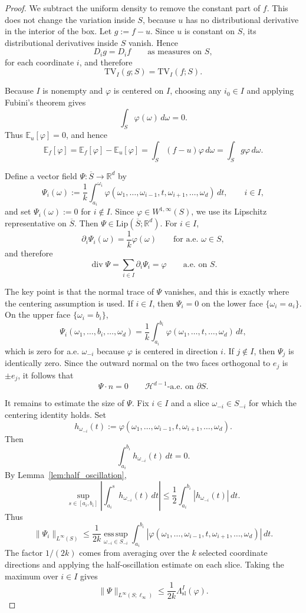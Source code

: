 \documentclass[10pt,a4paper]{amsart}
\newcommand{\TV}{\mathrm{TV}}
\begin{document}
\begin{proof}
We subtract the uniform density to remove the constant part of $f$. This does
not change the variation inside $S$, because $u$ has no distributional
derivative in the interior of the box. Let $g:=f-u$. Since $u$ is constant on
$S$, its distributional derivatives inside $S$ vanish. Hence
$$
D_i g=D_i f
\qquad\text{as measures on }S,
$$
for each coordinate $i$, and therefore
$$
\TV_I(g;S)=\TV_I(f;S).
$$

Because $I$ is nonempty and $\varphi$ is centered on $I$, choosing any
$i_0\in I$ and applying Fubini's theorem gives
$$
\int_S\varphi(\omega)\,d\omega=0.
$$
Thus $\mathbb E_u[\varphi]=0$, and hence
$$
\mathbb E_f[\varphi]
=
\mathbb E_f[\varphi]-\mathbb E_u[\varphi]
=
\int_S (f-u)\varphi\,d\omega
=
\int_S g\varphi\,d\omega.
$$

Define a vector field $\Psi:\overline S\to\mathbb R^d$ by
$$
\Psi_i(\omega)
:=
\frac1k
\int_{a_i}^{\omega_i}
\varphi(\omega_1,\ldots,\omega_{i-1},t,\omega_{i+1},\ldots,\omega_d)\,dt,
\qquad i\in I,
$$
and set $\Psi_i(\omega):=0$ for $i\notin I$. Since
$\varphi\in W^{1,\infty}(S)$, we use its Lipschitz representative on
$\overline S$. Then $\Psi\in\mathrm{Lip}(\overline S;\mathbb R^d)$. For
$i\in I$,
$$
\partial_i\Psi_i(\omega)=\frac1k\varphi(\omega)
\qquad\text{for a.e. }\omega\in S,
$$
and therefore
$$
\operatorname{div}\Psi
=
\sum_{i\in I}\partial_i\Psi_i
=
\varphi
\qquad\text{a.e. on }S.
$$

The key point is that the normal trace of $\Psi$ vanishes, and this is
exactly where the centering assumption is used. If $i\in I$, then $\Psi_i=0$ on the lower
face $\{\omega_i=a_i\}$. On the upper face $\{\omega_i=b_i\}$,
$$
\Psi_i(\omega_1,\ldots,b_i,\ldots,\omega_d)
=
\frac1k
\int_{a_i}^{b_i}
\varphi(\omega_1,\ldots,t,\ldots,\omega_d)\,dt,
$$
which is zero for a.e. $\omega_{-i}$ because $\varphi$ is centered in direction
$i$. If $j\notin I$, then $\Psi_j$ is identically zero. Since the outward
normal on the two faces orthogonal to $e_j$ is $\pm e_j$, it follows that
$$
\Psi\cdot n=0
\qquad
\mathcal H^{d-1}\text{-a.e. on }\partial S.
$$

It remains to estimate the size of $\Psi$. Fix $i\in I$ and a slice
$\omega_{-i}\in S_{-i}$ for which the centering identity holds. Set
$$
h_{\omega_{-i}}(t)
:=
\varphi(\omega_1,\ldots,\omega_{i-1},t,\omega_{i+1},\ldots,\omega_d).
$$
Then
$$
\int_{a_i}^{b_i}h_{\omega_{-i}}(t)\,dt=0.
$$
By Lemma~\ref{lem:half_oscillation},
$$
\sup_{s\in[a_i,b_i]}
\left|
\int_{a_i}^{s}h_{\omega_{-i}}(t)\,dt
\right|
\le
\frac12\int_{a_i}^{b_i}|h_{\omega_{-i}}(t)|\,dt.
$$
Thus
$$
\|\Psi_i\|_{L^\infty(S)}
\le
\frac{1}{2k}
\operatorname*{ess\,sup}_{\omega_{-i}\in S_{-i}}
\int_{a_i}^{b_i}
|\varphi(\omega_1,\ldots,\omega_{i-1},t,\omega_{i+1},\ldots,\omega_d)|\,dt.
$$
The factor $1/(2k)$ comes from averaging over the $k$ selected coordinate
directions and applying the half-oscillation estimate on each slice.
Taking the maximum over $i\in I$ gives
\begin{equation}
\label{eq:vector_field_sup_bound_tv}
\|\Psi\|_{L^\infty(S;\ell_\infty)}
\le
\frac{1}{2k}
\Lambda_{\mathrm{sl}}^I(\varphi).
\end{equation}


\end{proof}
\end{document}
